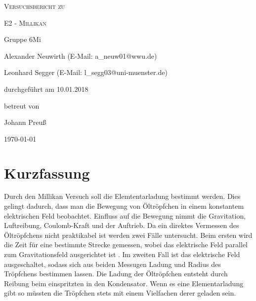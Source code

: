 \documentclass[
	a4paper,
	12pt,
	pagesize,
	ngerman
]{scrartcl}
\begin{document}
	
	\begin{titlepage}
		\centering
		{\scshape\LARGE Versuchsbericht zu \par}
		\vspace{1cm}
		{\scshape\huge E2 - Millikan \par}
		\vspace{2.5cm}
		{\LARGE Gruppe 6Mi \par}
		\vspace{0.5cm}
		
		{\large Alexander Neuwirth (E-Mail: a\_neuw01@wwu.de) \par}
		{\large Leonhard Segger (E-Mail: l\_segg03@uni-muenster.de) \par}
		\vfill
		
		durchgeführt am 10.01.2018\par
		betreut von\par
		{\large Johann Preuß}
		
		\vfill
		
		{\large \today\par}
	\end{titlepage}
	\tableofcontents
	\newpage
	
	\section{Kurzfassung}
	Durch den Millikan Versuch soll die Elemtentarladung bestimmt werden.
	Dies gelingt dadurch, dass man die Bewegung von Öltröpfchen in einem konstantem elektrischen Feld beobachtet.
	Einfluss auf die Bewegung nimmt die Gravitation, Luftreibung, Coulomb-Kraft und der Auftrieb.
	Da ein direktes Vermessen des Öltröpfchens nicht praktikabel ist werden zwei Fälle untersucht.
	Beim ersten wird die Zeit für eine bestimmte Strecke gemessen, wobei das elektrische Feld parallel zum Gravitationsfeld ausgerichtet ist . 
	Im zweiten Fall ist das elektrische Feld ausgeschaltet, sodass sich aus beiden Messugen Ladung und Radius des Tröpfchens bestimmen lassen.
	Die Ladung der Öltröpfchen entsteht durch Reibung beim einspritzten in den Kondensator. 
	Wenn es eine Elementarladung gibt so müssten die Tröpfchen stets mit einem Vielfachen derer geladen sein. %
\end{document}
